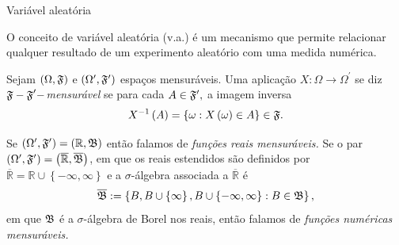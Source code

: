 \begin{frame}{Variável aleatória}

O conceito de variável aleatória (v.a.) é um mecanismo que permite relacionar qualquer resultado de um experimento aleatório com uma medida
numérica.

\begin{defi}
	Sejam $\left( \Omega ,\frak{F}\right) $ e $\left( \Omega ^{\prime },\frak{F}%
	^{\prime }\right) $ espaços mensuráveis. Uma aplicação $X:\Omega
	\rightarrow \Omega ^{\prime }$ se diz $\frak{F-F}^{\prime
	}-$\textit{mensurável} se para cada $A\in \frak{F}^{\prime },$ a imagem inversa $$X^{-1}\left(
	A\right) =\left\{
	\omega :X\left( \omega \right) \in A\right\} \in \frak{F}.$$
\end{defi}

\begin{defi}
	Se $\left( \Omega ^{\prime },\frak{F}^{\prime }\right) =\left( \mathbb{R},%
	\frak{B}\right) $ então falamos de \textit{funções reais mensuráveis.}
	Se o par $\left( \Omega ^{\prime },\frak{F}^{\prime }\right) =\left( \overline{%
		\mathbb{R}},\overline{\frak{B}}\right) $, em que os reais estendidos são definidos por $\overline{\mathbb{R}}=%
	\mathbb{R\cup }\left\{ -\infty ,\infty \right\} $ e a $\sigma$-álgebra associada a $\overline{\mathbb{R}}$ é
	$$\overline{\frak{B}}:=\left\{ B,B\cup \left\{ \infty \right\} ,B\cup \left\{ -\infty ,\infty
	\right\} :B\in \frak{B}\right\},$$ em que $\frak{B}$ é a $\sigma$-álgebra de Borel nos reais, então falamos de \textit{funções
		num\'{e}ricas mensuráveis.}
\end{defi}


\end{frame}

